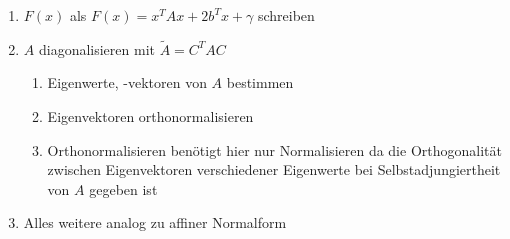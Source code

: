\begin{enumerate}[leftmargin=4mm]
	\item $F(x)$ als $F(x) = x^TAx + 2b^Tx + \gamma$ schreiben
	\item $A$ diagonalisieren mit $\tilde A = C^TAC$
	\begin{enumerate}[leftmargin=4mm,label=(\roman*)]
		\item Eigenwerte, -vektoren von $A$ bestimmen
		\item Eigenvektoren orthonormalisieren
		\item Orthonormalisieren benötigt hier nur Normalisieren da die Orthogonalität zwischen Eigenvektoren verschiedener Eigenwerte bei Selbstadjungiertheit von $A$ gegeben ist
	\end{enumerate}
	\item Alles weitere analog zu affiner Normalform
\end{enumerate}
